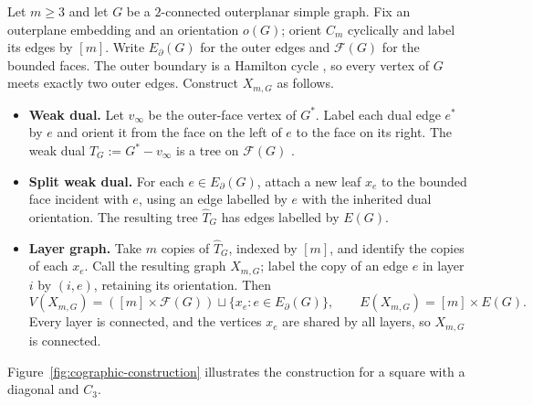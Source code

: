 \documentclass[12pt,a4paper]{article}
\numberwithin{equation}{section}
\theoremstyle{definition}
\theoremstyle{remark}
\begin{document}
Let \(m\ge3\) and let \(G\) be a \(2\)-connected outerplanar
simple graph.  Fix an outerplane embedding and an orientation
\(o(G)\); orient \(C_m\) cyclically and label its edges by \([m]\).
Write \(E_\partial(G)\) for the outer edges and \(\mathcal F(G)\)
for the bounded faces.  The outer boundary is a Hamilton cycle
\cite[p.~436]{chartrand-harary}, so every vertex of \(G\) meets
exactly two outer edges.  Construct \(X_{m,G}\) as follows.
\begin{itemize}
\item \textbf{Weak dual.} Let \(v_\infty\) be the outer-face vertex
of \(G^*\).  Label each dual edge \(e^*\) by \(e\) and orient it
from the face on the left of \(e\) to the face on its right.  The
weak dual \(T_G:=G^*-v_\infty\) is a tree on \(\mathcal F(G)\)
\cite[Theorem~1]{fleischner-geller-harary}.
\item \textbf{Split weak dual.} For each \(e\in E_\partial(G)\),
attach a new leaf \(x_e\) to the bounded face incident with \(e\),
using an edge labelled by \(e\) with the inherited dual orientation.
The resulting tree \(\widehat T_G\) has edges labelled by \(E(G)\).
\item \textbf{Layer graph.} Take \(m\) copies of \(\widehat T_G\),
indexed by \([m]\), and identify the copies of each \(x_e\).
Call the resulting graph \(X_{m,G}\); label the copy of an edge \(e\)
in layer \(i\) by \((i,e)\), retaining its orientation.  Then
\begin{equation}\label{eq:vertex-edge}
V(X_{m,G})=([m]\times\mathcal F(G))\sqcup\{x_e:e\in E_\partial(G)\},\qquad E(X_{m,G})=[m]\times E(G).
\end{equation}
Every layer is connected, and the vertices \(x_e\) are shared by
all layers, so \(X_{m,G}\) is connected.
\end{itemize}
Figure~\ref{fig:cographic-construction} illustrates the construction for a square with a diagonal and \(C_3\).
\end{document}
